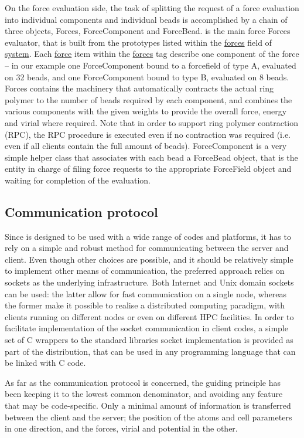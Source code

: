 \documentclass[11pt,english,fleqn]{report}
\begin{document}
On the force evaluation side, the task of splitting the request of a
force evaluation into individual components and individual beads is 
accomplished by a chain of three objects, Forces, ForceComponent and ForceBead.
is the main force Forces evaluator, that is built from the prototypes
listed within the \hyperref[FORCES]{forces} field of \hyperref[SYSTEM]{system}.
Each \hyperref[FORCECOMPONENT]{force} item within the 
\hyperref[FORCES]{forces} tag describe one component of the force --
in our example one ForceComponent bound to a forcefield of type A, 
evaluated on 32 beads, and one ForceComponent bound to type B, evaluated
on 8 beads. Forces contains the machinery that automatically contracts the
actual ring polymer to the number of beads required by each component,
and combines the various components with the given weights to provide the 
overall force, energy and virial where required. Note that in order to support
ring polymer contraction (RPC), the RPC procedure is executed even if
no contraction was required (i.e. even if all clients contain the full amount of beads). 
ForceComponent is a very simple helper class that associates with each bead 
a ForceBead object, that is the entity in charge of filing force requests to
the appropriate ForceField object and waiting for completion of the
evaluation. 


\subsection{Communication protocol}

Since \ipi is designed to be used with a wide range of codes and
platforms, it has to rely on a simple and robust method for communicating
between the server and client. Even though other choices are possible,
and it should be relatively simple to implement other means of communication,
the preferred approach relies on sockets as the underlying infrastructure.
Both Internet and Unix domain sockets can be used: the latter allow
for fast communication on a single node, whereas the former make
it possible to realise a distributed computing paradigm, with clients
running on different nodes or even on different HPC facilities. In
order to facilitate implementation of the socket communication in
client codes, a simple set of C wrappers to the standard libraries
socket implementation is provided as part of the \ipi distribution,
that can be used in any programming language that can be linked with
C code.

As far as the communication protocol is concerned, the guiding principle
has been keeping it to the lowest common denominator, and avoiding
any feature that may be code-specific. Only a minimal amount of information
is transferred between the client and the server; the position of
the atoms and cell parameters in one direction, and the forces, virial
and potential in the other.
\end{document}
